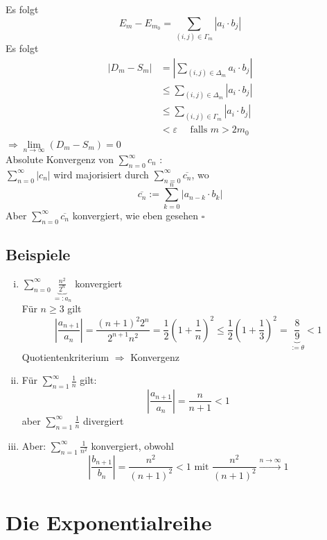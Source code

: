 Es folgt
\[
	E_m - E_{m_0} = \sum\limits_{(i,j) \in \Gamma_m} | a_i \cdot b_j |
\]
Es folgt
\begin{align*}
	|D_m -S_m | &= \left| \sum\limits_{(i,j) \in \Delta_m} a_i \cdot  b_j \right| \\
	&\le \sum\limits_{(i,j) \in \Delta_m} | a_i \cdot b_j | \\
	&\le \sum\limits_{(i,j) \in \Gamma_m} | a_i \cdot b_j | \\
	&< \varepsilon \quad \text{ falls } m >2m_0
\end{align*}
$\Rightarrow \lim\limits_{n \to \infty} (D_m -S_m) = 0$ \\
Absolute Konvergenz von $\sum\limits_{n=0}^{\infty} c_n$ : 
\vspace{10pt} \\
$\sum\limits_{n=0}^{\infty} |c_n|$ wird majorisiert durch $\sum\limits_{n=0}^{\infty} \overline{c_n}$, wo
\[
	\overline{c_n} := \sum\limits_{k=0}^{n} |a_{n-k} \cdot b_k|
\]
Aber $\sum\limits_{n=0}^{\infty} \overline{c_n}$ konvergiert, wie eben gesehen \hfill \( \square \)

\subsection{Beispiele} %
\label{sub:beispiele}
\begin{enumerate}[(i)]
	\item $\sum\limits_{n=0}^{\infty} \underbrace{\frac{n^2}{2^n}}_{=: a_n}$ konvergiert
	\vspace{10pt} \\
	Für $n \ge 3$ gilt
	\[
		\left| \frac{a_{n+1}}{a_n}\right| = \frac{(n+1)^2 2^n}{2^{n+1} n^2} = \frac{1}{2}\left( 1+ \frac{1}{n}\right) ^2
		\le \frac{1}{2} \left( 1+ \frac{1}{3}\right) ^2 = \underbrace{\frac{8}{9}}_{:= \theta} <1
	\]
	Quotientenkriterium $\Rightarrow$ Konvergenz
	\item Für $\sum\limits_{n=1}^{\infty} \frac{1}{n}$ gilt:
	\[
		\left| \frac{a_{n+1}}{a_n} \right| = \frac{n}{n+1} < 1
	\]
	aber $\sum\limits_{n=1}^{\infty} \frac{1}{n} $ divergiert
	\item Aber: $\sum\limits_{n=1}^{\infty} \frac{1}{n^2} $ konvergiert, obwohl
	\[
		\left| \frac{b_{n+1}}{b_n}\right| = \frac{n^2}{(n+1)^2} < 1 \text{ mit } \frac{n^2}{(n+1)^2} \xrightarrow{n \to \infty} 1
	\]
\end{enumerate}

\section{Die Exponentialreihe} %
\label{sec:die_exponentialreihe}

